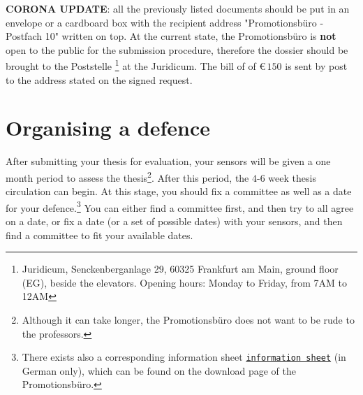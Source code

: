 \documentclass[a4paper]{article}
\newcommand{\file}[2][]{%
    \ifthenelse{\isempty{#1}}%
        {\textcolor{fileColor}{#2}}%
        {\href{run:#1}{\texttt{\textcolor{fileColor}{#2}}}}%
}
\begin{document}
        \textbf{CORONA UPDATE}: all the previously listed documents should be put in an envelope or a cardboard box with the recipient address "Promotionsb\"uro - Postfach 10" written on top. At the current state, the Promotionsb\"uro is \textbf{not} open to the public for the submission procedure, therefore the dossier should be brought to the Poststelle \footnote{Juridicum, Senckenberganlage 29, 60325 Frankfurt am Main, ground floor (EG), beside the elevators. Opening hours: Monday to Friday, from 7AM to 12AM} at the Juridicum. The bill of of \euro$\,150$ is sent by post to the address stated on the {signed request}.
        

    \section*{Organising a defence}\label{defence}
        After submitting your thesis for evaluation, your sensors will be given a one month period to assess the thesis\footnote{Although it can take longer, the Promotionsb\"uro does not want to be rude to the professors.}.
        After this period, the $4$-$6$ week thesis circulation can begin.
        At this stage, you should fix a committee as well as a date for your defence.\footnote{There exists also a corresponding \file[Merkblatt_Physik.pdf]{information sheet} (in German only), which can be found on the download page of the Promotionsb\"uro.}
        You can either find a committee first, and then try to all agree on a date, or fix a date (or a set of possible dates) with your sensors, and then find a committee to fit your available dates.
\end{document}
